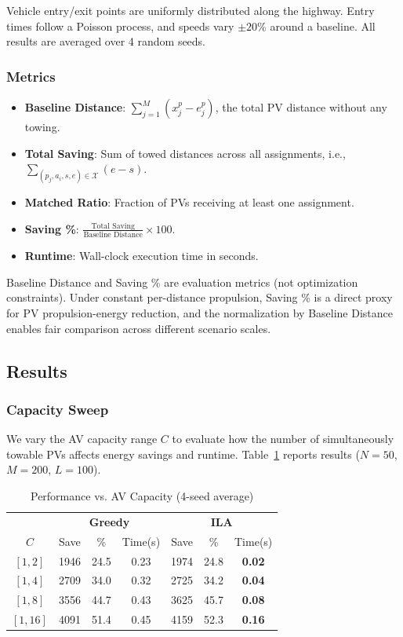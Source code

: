 \documentclass[conference]{IEEEtran}
\begin{document}
Vehicle entry/exit points are uniformly distributed along the highway. Entry times follow a Poisson process, and speeds vary $\pm 20\%$ around a baseline. All results are averaged over 4 random seeds.

\subsubsection{Metrics}

\begin{itemize}
    \item \textbf{Baseline Distance}: $\sum_{j=1}^{M} (x_j^p - e_j^p)$, the total PV distance without any towing.
    \item \textbf{Total Saving}: Sum of towed distances across all assignments, i.e., $\sum_{(p_j, a_i, s, e) \in \mathcal{X}} (e - s)$.
    \item \textbf{Matched Ratio}: Fraction of PVs receiving at least one assignment.
    \item \textbf{Saving \%}: $\frac{\text{Total Saving}}{\text{Baseline Distance}} \times 100$.
    \item \textbf{Runtime}: Wall-clock execution time in seconds.
\end{itemize}

Baseline Distance and Saving \% are evaluation metrics (not optimization constraints). Under constant per-distance propulsion, Saving \% is a direct proxy for PV propulsion-energy reduction, and the normalization by Baseline Distance enables fair comparison across different scenario scales.

\subsection{Results}

\subsubsection{Capacity Sweep}
We vary the AV capacity range $C$ to evaluate how the number of simultaneously towable PVs affects energy savings and runtime.
Table~\ref{tab:capacity} reports results ($N=50$, $M=200$, $L=100$).

\begin{table}[htbp]
\caption{Performance vs. AV Capacity (4-seed average)}
\label{tab:capacity}
\centering
\begin{tabular}{c|ccc|ccc}
\toprule
& \multicolumn{3}{c|}{\textbf{Greedy}} & \multicolumn{3}{c}{\textbf{ILA}} \\
$C$ & Save & \% & Time(s) & Save & \% & Time(s) \\
\midrule
$[1,2]$ & 1946 & 24.5 & 0.23 & 1974 & 24.8 & \textbf{0.02} \\
$[1,4]$ & 2709 & 34.0 & 0.32 & 2725 & 34.2 & \textbf{0.04} \\
$[1,8]$ & 3556 & 44.7 & 0.43 & 3625 & 45.7 & \textbf{0.08} \\
$[1,16]$ & 4091 & 51.4 & 0.45 & 4159 & 52.3 & \textbf{0.16} \\
\bottomrule
\end{tabular}
\end{table}
\end{document}
